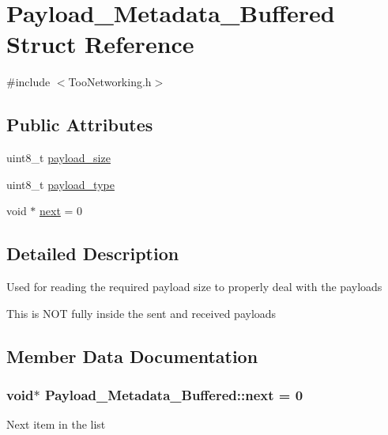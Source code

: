 \hypertarget{structPayload__Metadata__Buffered}{}\section{Payload\+\_\+\+Metadata\+\_\+\+Buffered Struct Reference}
\label{structPayload__Metadata__Buffered}


{\ttfamily \#include $<$Too\+Networking.\+h$>$}

\subsection*{Public Attributes}
\begin{DoxyCompactItemize}
\item 
uint8\+\_\+t \hyperlink{structPayload__Metadata__Buffered_ac422a1798dc5be1d2000ef6be0f00db3}{payload\+\_\+size}
\item 
uint8\+\_\+t \hyperlink{structPayload__Metadata__Buffered_a662a18fe5f3e5a48117259f1e94bed39}{payload\+\_\+type}
\item 
void $\ast$ \hyperlink{structPayload__Metadata__Buffered_a54d2638a00947eda0fa17587f12e7efc}{next} = 0
\end{DoxyCompactItemize}


\subsection{Detailed Description}
Used for reading the required payload size to properly deal with the payloads

This is N\+OT fully inside the sent and received payloads 

\subsection{Member Data Documentation}
\subsubsection[{\texorpdfstring{next}{next}}]{\setlength{\rightskip}{0pt plus 5cm}void$\ast$ Payload\+\_\+\+Metadata\+\_\+\+Buffered\+::next = 0}\hypertarget{structPayload__Metadata__Buffered_a54d2638a00947eda0fa17587f12e7efc}{}\label{structPayload__Metadata__Buffered_a54d2638a00947eda0fa17587f12e7efc}
Next item in the list 
